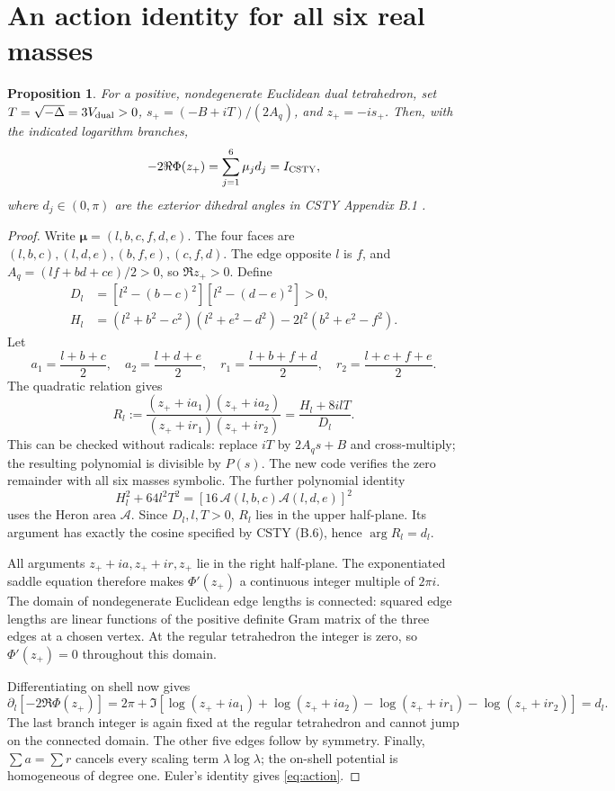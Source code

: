 \documentclass[11pt,a4paper]{article}
\newtheorem{proposition}{Proposition}
\begin{document}
\section{An action identity for all six real masses}
\begin{proposition}
For a positive, nondegenerate Euclidean dual tetrahedron, set
\(T=\sqrt{-\Delta}=3V_{\rm dual}>0\),
\(s_+=(-B+iT)/(2A_q)\), and \(z_+=-is_+\).
Then, with the indicated logarithm branches,
\begin{equation}
 -2\Re\Phi(z_+)=\sum_{j=1}^6\mu_jd_j=I_{\rm CSTY},
 \label{eq:action}
\end{equation}
where \(d_j\in(0,\pi)\) are the exterior dihedral angles in
CSTY Appendix B.1 \cite{CSTY}.
\end{proposition}

\begin{proof}
Write \(\boldsymbol\mu=(l,b,c,f,d,e)\).
The four faces are \((l,b,c),(l,d,e),(b,f,e),(c,f,d)\).
The edge opposite \(l\) is \(f\), and
\(A_q=(lf+bd+ce)/2>0\), so \(\Re z_+>0\).
Define
\begin{align}
 D_l&=[l^2-(b-c)^2][l^2-(d-e)^2]>0,\\
 H_l&=(l^2+b^2-c^2)(l^2+e^2-d^2)
       -2l^2(b^2+e^2-f^2).
\end{align}
Let
\[
 a_1=\frac{l+b+c}{2},\quad a_2=\frac{l+d+e}{2},\quad
 r_1=\frac{l+b+f+d}{2},\quad r_2=\frac{l+c+f+e}{2}.
\]
The quadratic relation gives
\begin{equation}
 R_l:=\frac{(z_++ia_1)(z_++ia_2)}
              {(z_++ir_1)(z_++ir_2)}
       =\frac{H_l+8ilT}{D_l}.
 \label{eq:angle-ratio}
\end{equation}
This can be checked without radicals: replace \(iT\) by \(2A_qs+B\)
and cross-multiply; the resulting polynomial is divisible by \(P(s)\).
The new code verifies the zero remainder with all six masses symbolic.
The further polynomial identity
\[
 H_l^2+64l^2T^2=
 [16\,\mathcal A(l,b,c)\mathcal A(l,d,e)]^2
\]
uses the Heron area \(\mathcal A\).
Since \(D_l,l,T>0\), \(R_l\) lies in the upper half-plane.
Its argument has exactly the cosine specified by CSTY (B.6),
hence \(\arg R_l=d_l\).

All arguments \(z_++ia,z_++ir,z_+\) lie in the right half-plane.
The exponentiated saddle equation therefore makes \(\Phi'(z_+)\)
a continuous integer multiple of \(2\pi i\). The domain of
nondegenerate Euclidean edge lengths is connected: squared edge
lengths are linear functions of the positive definite Gram matrix
of the three edges at a chosen vertex.
At the regular tetrahedron the integer is zero, so \(\Phi'(z_+)=0\)
throughout this domain.

Differentiating on shell now gives
\begin{equation}
 \partial_l[-2\Re\Phi(z_+)]
 =2\pi+\Im\left[
 \log(z_++ia_1)+\log(z_++ia_2)
 -\log(z_++ir_1)-\log(z_++ir_2)\right]=d_l .
\end{equation}
The last branch integer is again fixed at the regular tetrahedron
and cannot jump on the connected domain.
The other five edges follow by symmetry.
Finally, \(\sum a=\sum r\) cancels every scaling term
\(\lambda\log\lambda\); the on-shell potential is homogeneous of
degree one. Euler's identity gives \eqref{eq:action}.
\end{proof}
\end{document}
